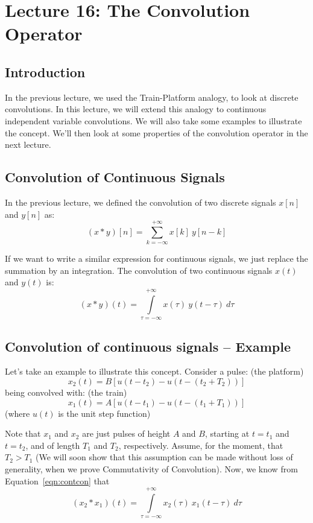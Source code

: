 \section{Lecture 16: The Convolution Operator}

\subsection{Introduction}
In the previous lecture, we used the Train-Platform analogy, to look at discrete convolutions. In this lecture, we will extend this analogy to continuous independent variable convolutions. We will also take some examples to illustrate the concept. We'll then look at some properties of the convolution operator in the next lecture.

\subsection{Convolution of Continuous Signals}

In the previous lecture, we defined the convolution of two discrete signals $x[n]$ and $y[n]$ as:
\begin{equation}
\label{eqn:discon}
\left(x \ast y\right)[n] = \sum_{k=-\infty}^{+\infty} x[k]\ y[n-k]
\end{equation}

If we want to write a similar expression for continuous signals, we just replace the summation by an integration. The convolution of two continuous signals $x(t)$ and $y(t)$ is:
\begin{equation}
\label{eqn:contcon}
(x\ast y)(t) =\int\limits_{\tau=-\infty}^{+\infty} x(\tau)\ y(t-\tau)\ d\tau
\end{equation}

\subsection{Convolution of continuous signals -- Example}

Let's take an example to illustrate this concept. Consider a pulse: (the platform)
$$x_2(t) = B\left[ u(t-t_2) - u(t-(t_2 + T_2))\right]$$ being convolved with: (the train) $$x_1(t) = A\left[ u(t-t_1) - u(t-(t_1 + T_1))\right]$$ (where $u(t)$ is the unit step function)

Note that $x_1$ and $x_2$ are just pulses of height $A$ and $B$, starting at $t=t_1$ and $t=t_2$, and of length $T_1$ and $T_2$, respectively. Assume, for the moment, that $T_2 > T_1$ (We will soon show that this assumption can be made without loss of generality, when we prove Commutativity of Convolution). Now, we know from Equation~\ref{eqn:contcon} that
$$(x_2\ast x_1)(t) =\int\limits_{\tau=-\infty}^{+\infty} x_2(\tau)\ x_1(t-\tau)\ d\tau$$

